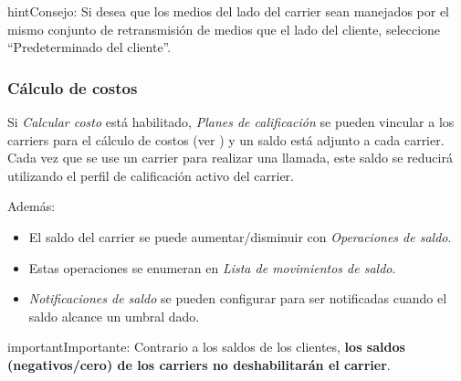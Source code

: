 \documentclass[letterpaper,10pt,spanish]{sphinxmanual}
\begin{document}
\begin{notice}{hint}{Consejo:}
Si desea que los medios del lado del carrier sean manejados por el mismo conjunto de retransmisión de medios que el lado del cliente, seleccione ``Predeterminado del cliente''.
\end{notice}


\subsubsection{Cálculo de costos}
\label{administration_portal/brand/providers/carriers:cost-calculation}\label{administration_portal/brand/providers/carriers:id2}
Si \emph{Calcular costo} está habilitado, \emph{Planes de calificación} se pueden vincular a los carriers para el cálculo de costos (ver {\hyperref[administration_portal/brand/billing/rating_plans:assigning\string-rating\string-plans\string-to\string-carriers]{}}) y un saldo está adjunto a cada carrier. Cada vez que se use un carrier para realizar una llamada, este saldo se reducirá utilizando el perfil de calificación activo del carrier.

Además:
\begin{itemize}
\item {} 
El saldo del carrier se puede aumentar/disminuir con \emph{Operaciones de saldo}.

\item {} 
Estas operaciones se enumeran en \emph{Lista de movimientos de saldo}.

\item {} 
\emph{Notificaciones de saldo} se pueden configurar para ser notificadas cuando el saldo alcance un umbral dado.

\end{itemize}

\begin{notice}{important}{Importante:}
Contrario a los saldos de los clientes, \textbf{los saldos (negativos/cero) de los carriers no deshabilitarán el carrier}.
\end{notice}
\end{document}
